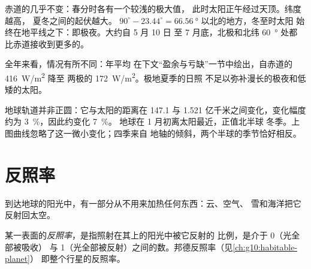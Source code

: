 \begin{remark}[读懂曲线]\label{rem:g10:earth-energy-budget:curves}
赤道的几乎不变：春分时各有一个较浅的极大值，
此时太阳正午经过天顶。纬度越高，
夏冬之间的起伏越大。
$90^\circ - 23.44^\circ = \qty{66.56}{\degree}$ 以北的地方，冬至时太阳
始终在地平线之下：即极夜。大约自 5 月 10 日
至 7 月底，北极和北纬 \qty{60}{\degree} 处都
比赤道接收到更多的。
\end{remark}

全年来看，情况有所不同：年平均
在下文“盈余与亏缺”一节中绘出，自赤道的 \qty{416}{W/m^2} 降至
两极的 \qty{172}{W/m^2}。极地夏季的日照
不足以弥补漫长的极夜和低矮的太阳。

\begin{remark}[日地距离并不造成四季]\label{rem:g10:earth-energy-budget:distance}
地球轨道并非正圆：它与太阳的距离在
\num{147.1} 与 1.521 亿千米之间变化，变化幅度约为
\qty{3}{\percent}，因此约变化 \qty{7}{\percent}。
地球在 1 月初离太阳最近，正值北半球
冬季。上图曲线忽略了这一微小变化；四季来自
地轴的倾斜，两个半球的季节恰好相反。
\end{remark}

\section{反照率}

到达地球的阳光中，有一部分从不用来加热任何东西：云、空气、
雪和海洋把它反射回太空。

\begin{definition}[反照率]\label{def:g10:earth-energy-budget:albedo}
某一表面的\emph{反照率}，是指照射在其上的阳光中被它反射的
比例，是介于 0（光全部被吸收）
与 1（光全部被反射）之间的数。邦德反照率（见\cref{ch:g10:habitable-planet}）
即整个行星的反照率。
\end{definition}

